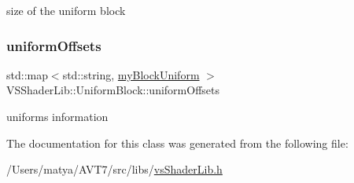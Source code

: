 size of the uniform block 

\mbox{\label{class_v_s_shader_lib_1_1_uniform_block_a94df01b8bf010f83a750d9807139c43f}} 
\subsubsection{\texorpdfstring{uniform\+Offsets}{uniformOffsets}}
{\footnotesize\ttfamily std\+::map$<$std\+::string, \hyperlink{class_v_s_shader_lib_a0543003357c93b57bfe99a9aa3e0898d}{my\+Block\+Uniform} $>$ V\+S\+Shader\+Lib\+::\+Uniform\+Block\+::uniform\+Offsets}



uniforms information 



The documentation for this class was generated from the following file\+:\begin{DoxyCompactItemize}
\item 
/\+Users/matya/\+A\+V\+T7/src/libs/\hyperlink{vs_shader_lib_8h}{vs\+Shader\+Lib.\+h}\end{DoxyCompactItemize}
